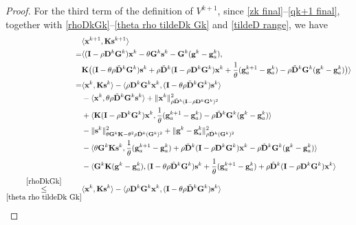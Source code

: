 \documentclass[12pt,draftcls,onecolumn]{IEEEtran}
\begin{document}
\begin{proof}
For the third term of the definition of $V^{k+1}$, since \eqref{zk final}--\eqref{qk+1 final}, together with \eqref{rhoDkGk}--\eqref{theta rho tildeDk Gk} and \eqref{tildeD range}, we have
\begin{align}
	& \langle \mathbf{x}^{k+1}, \mathbf{K}\mathbf{s}^{k+1} \rangle \notag\\
	=& \langle (\mathbf{I}-\rho\mathbf{D}^k\mathbf{G}^k)\mathbf{x}^{k} - \theta\mathbf{G}^k\mathbf{s}^k- \mathbf{G}^k(\mathbf{g}^k-\mathbf{g}_a^k),  \notag\\
	&\mathbf{K}\big((\mathbf{I}-\theta\rho\tilde{\mathbf{D}}^k\mathbf{G}^k)\mathbf{s}^k+ \rho \tilde{\mathbf{D}}^k(\mathbf{I}-\rho \mathbf{D}^k\mathbf{G}^k)\mathbf{x}^k+\frac{1}{\theta}(\mathbf{g}_a^{k+1}-\mathbf{g}_a^k)-\rho\tilde{\mathbf{D}}^k\mathbf{G}^k(\mathbf{g}^k-\mathbf{g}_a^k) \big) \rangle\notag\\
	=& \langle \mathbf{x}^k, \mathbf{K}\mathbf{s}^{k} \rangle - \langle \rho\mathbf{D}^k\mathbf{G}^k\mathbf{x}^k,(\mathbf{I}-\theta\rho\tilde{\mathbf{D}}^k\mathbf{G}^k)\mathbf{s}^k \rangle\notag\\
	&-\langle \mathbf{x}^k,\theta\rho\tilde{\mathbf{D}}^k\mathbf{G}^k\mathbf{s}^k\rangle + \|\mathbf{x}^k\|^2_{\rho \tilde{\mathbf{D}}^k(\mathbf{I}-\rho\mathbf{D}^k\mathbf{G}^k)^2}\notag\\
	&+\langle \mathbf{K}(\mathbf{I}-\rho\mathbf{D}^k\mathbf{G}^k)\mathbf{x}^k,\frac{1}{\theta}(\mathbf{g}_a^{k+1}-\mathbf{g}_a^k)-\rho\tilde{\mathbf{D}}^k\mathbf{G}^k(\mathbf{g}^k-\mathbf{g}_a^k)\rangle\notag\\
	& -\|\mathbf{s}^k\|^2_{\theta \mathbf{G}^k\mathbf{K}-\theta^2\rho\tilde{\mathbf{D}}^k(\mathbf{G}^k)^2}+\|\mathbf{g}^k-\mathbf{g}_a^k\|^2_{\rho \tilde{\mathbf{D}}^k(\mathbf{G}^k)^2} \notag\\
    &-\langle \theta\mathbf{G}^k\mathbf{K}\mathbf{s}^k,\frac{1}{\theta}(\mathbf{g}_a^{k+1}-\mathbf{g}_a^k) +\rho\tilde{\mathbf{D}}^k(\mathbf{I}-\rho\mathbf{D}^k\mathbf{G}^k)\mathbf{x}^k- \rho\tilde{\mathbf{D}}^k\mathbf{G}^k(\mathbf{g}^k-\mathbf{g}_a^k)\rangle \notag\\
	& -\langle \mathbf{G}^k\mathbf{K}(\mathbf{g}^k-\mathbf{g}_a^k), (\mathbf{I}-\theta\rho\tilde{\mathbf{D}}^k\mathbf{G}^k)\mathbf{s}^k +\frac{1}{\theta}(\mathbf{g}_a^{k+1}-\mathbf{g}_a^k) + \rho \tilde{\mathbf{D}}^k(\mathbf{I}-\rho \mathbf{D}^k\mathbf{G}^k)\mathbf{x}^k \rangle \notag\\
	\underset{\eqref{theta rho tildeDk Gk}}{\overset{\eqref{rhoDkGk}}{\leq}} & \langle \mathbf{x}^k, \mathbf{K}\mathbf{s}^{k} \rangle - \langle \rho\mathbf{D}^k\mathbf{G}^k\mathbf{x}^k,(\mathbf{I}-\theta\rho\tilde{\mathbf{D}}^k\mathbf{G}^k)\mathbf{s}^k \rangle\notag\\

\end{align}
\end{proof}
\end{document}
